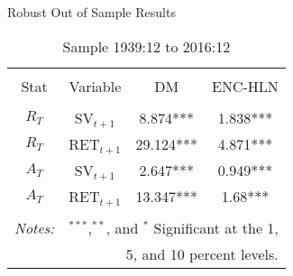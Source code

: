\documentclass{beamer}
\begin{document}
\begin{frame}{Robust Out of Sample Results}
	\vspace{-12pt}
	\begin{table}
		\caption{Sample 1939:12 to 2016:12}
		\vspace{-6pt}
		\begin{adjustbox}{center,max height=\totalheight}
			\begin{tabular}{cccc}
				\hline\\[-1.8ex]
				Stat & Variable & DM & ENC-HLN \\
				\hline\\[-1.8ex]
				$R_{T}$ & SV$_{t+1}$ & 8.874*** & 1.838*** \\
				$R_{T}$ & RET$_{t+1}$ & 29.124*** & 4.871*** \\
				$A_{T}$ & SV$_{t+1}$ & 2.647*** & 0.949*** \\
				$A_{T}$ & RET$_{t+1}$ & 13.347*** & 1.68*** \\
				\hline\\[-1.8ex]
				\textit{Notes:} & \multicolumn{3}{r}{$^{***}$,$^{**}$, and $^{*}$ Significant at the 1,}\\
				& \multicolumn{3}{r}{ 5, and 10 percent levels.}
			\end{tabular}
		\end{adjustbox}

\end{table}
\end{frame}
\end{document}
